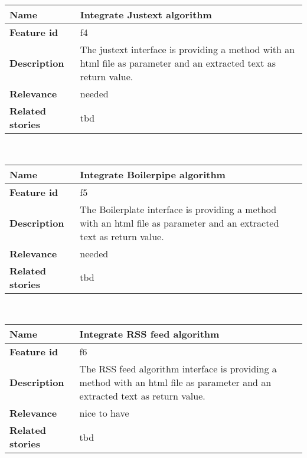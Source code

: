 	\begin{tabular}{ | p{3cm} | p{12cm} |}
	\hline
	\textbf{Name} 				& Integrate Justext algorithm \\ \hline
	\textbf{Feature id} 		& f4 \\ \hline
	\textbf{Description} 		& The justext interface is providing a method with an html file as parameter and an extracted text as return value. \\ \hline
	\textbf{Relevance} 			& needed \\ \hline
	\textbf{Related stories} 	& tbd \\ \hline
	\end{tabular} \\


	\begin{tabular}{ | p{3cm} | p{12cm} |}
	\hline
	\textbf{Name} 				& Integrate Boilerpipe algorithm \\ \hline
	\textbf{Feature id} 		& f5 \\ \hline
	\textbf{Description} 		& The Boilerplate interface is providing a method with an html file as parameter and an extracted text as return value. \\ \hline
	\textbf{Relevance} 			& needed \\ \hline
	\textbf{Related stories} 	& tbd \\ \hline
	\end{tabular} \\

\begin{tabular}{ | p{3cm} | p{12cm} |}
	\hline
	\textbf{Name} 				& Integrate RSS feed algorithm \\ \hline
	\textbf{Feature id} 		& f6 \\ \hline
	\textbf{Description} 		& The RSS feed algorithm interface is providing a method with an html file as parameter and an extracted text as return value. \\ \hline
	\textbf{Relevance} 			& nice to have\\ \hline
	\textbf{Related stories} 	& tbd \\ \hline
	\end{tabular} \\

